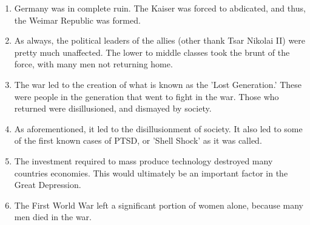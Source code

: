 \documentclass[12pt]{article}
\begin{document}
\begin{enumerate}
\item Germany was in complete ruin. The Kaiser was forced to abdicated, and thus, the Weimar Republic was formed.

\item As always, the political leaders of the allies (other thank Tsar Nikolai II) were pretty much unaffected. The lower to middle classes took the brunt of the force, with many men not returning home.

\item The war led to the creation of what is known as the 'Lost Generation.' These were people in the generation that went to fight in the war. Those who returned were disillusioned, and dismayed by society.

\item As aforementioned, it led to the disillusionment of society. It also led to some of the first known cases of PTSD, or 'Shell Shock' as it was called.

\item The investment required to mass produce technology destroyed many countries economies. This would ultimately be an important factor in the Great Depression.

\item The First World War left a significant portion of women alone, because many men died in the war.
\end{enumerate}
\end{document}
